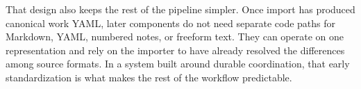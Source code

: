 That design also keeps the rest of the pipeline simpler. Once import has produced canonical work YAML, later components do not need separate code paths for Markdown, YAML, numbered notes, or freeform text. They can operate on one representation and rely on the importer to have already resolved the differences among source formats. In a system built around durable coordination, that early standardization is what makes the rest of the workflow predictable.
